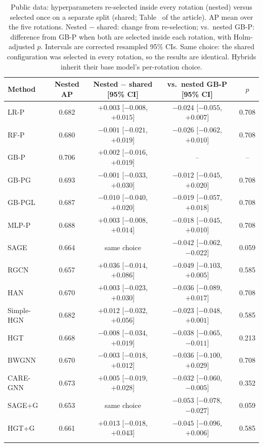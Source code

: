 \begin{table}[h]
\caption{Public data: hyperparameters re-selected inside every rotation (nested) versus selected once on a separate split (shared; Table~\MainTabKaggle{} of the article). AP mean over the five rotations. Nested $-$ shared: change from re-selection; vs.\ nested GB-P: difference from GB-P when both are selected inside each rotation, with Holm-adjusted $p$. Intervals are corrected resampled 95\% CIs. Same choice: the shared configuration was selected in every rotation, so the results are identical. Hybrids inherit their base model's per-rotation choice.}\label{tab:kaggle_nested}
\scriptsize
\setlength{\tabcolsep}{3pt}
\begin{tabular}{@{}lcccc@{}}
\toprule
Method & Nested AP & Nested $-$ shared [95\% CI] & vs.\ nested GB-P [95\% CI] & $p$ \\
\midrule
LR-P & 0.682 & $+0.003$ [$-0.008$, $+0.015$] & $-0.024$ [$-0.055$, $+0.007$] & 0.708 \\
RF-P & 0.680 & $-0.001$ [$-0.021$, $+0.019$] & $-0.026$ [$-0.062$, $+0.010$] & 0.708 \\
GB-P & 0.706 & $+0.002$ [$-0.016$, $+0.019$] & -- & -- \\
GB-PG & 0.693 & $-0.001$ [$-0.033$, $+0.030$] & $-0.012$ [$-0.045$, $+0.020$] & 0.708 \\
GB-PGL & 0.687 & $-0.010$ [$-0.040$, $+0.020$] & $-0.019$ [$-0.057$, $+0.018$] & 0.708 \\
MLP-P & 0.688 & $+0.003$ [$-0.008$, $+0.014$] & $-0.018$ [$-0.045$, $+0.010$] & 0.708 \\
SAGE & 0.664 & same choice & $-0.042$ [$-0.062$, $-0.022$] & 0.059 \\
RGCN & 0.657 & $+0.036$ [$-0.014$, $+0.086$] & $-0.049$ [$-0.103$, $+0.005$] & 0.585 \\
HAN & 0.670 & $+0.003$ [$-0.023$, $+0.030$] & $-0.036$ [$-0.089$, $+0.017$] & 0.708 \\
Simple-HGN & 0.682 & $+0.012$ [$-0.032$, $+0.056$] & $-0.023$ [$-0.048$, $+0.001$] & 0.585 \\
HGT & 0.668 & $-0.008$ [$-0.034$, $+0.019$] & $-0.038$ [$-0.065$, $-0.011$] & 0.213 \\
BWGNN & 0.670 & $-0.003$ [$-0.018$, $+0.012$] & $-0.036$ [$-0.100$, $+0.029$] & 0.708 \\
CARE-GNN & 0.673 & $+0.005$ [$-0.019$, $+0.028$] & $-0.032$ [$-0.060$, $-0.005$] & 0.352 \\
SAGE+G & 0.653 & same choice & $-0.053$ [$-0.078$, $-0.027$] & 0.059 \\
HGT+G & 0.661 & $+0.013$ [$-0.018$, $+0.043$] & $-0.045$ [$-0.096$, $+0.006$] & 0.585 \\
\botrule
\end{tabular}
\end{table}